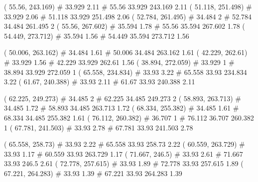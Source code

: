 \documentclass[a4paper,openbib,10pt]{article}
\newenvironment{treegraph}{\begin{graph}}{\end{graph}}
\begin{document}
\begin{treegraph}
  ( 55.56, 243.169) #     33.929    2.11
   #    55.56    33.929    243.169    2.11
  ( 51.118, 251.498) #     33.929    2.06
   #    51.118    33.929    251.498    2.06
  ( 52.784, 261.495) #     34.484    2
   #    52.784    34.484    261.495    2
  ( 55.56, 267.602) #     35.594    1.78
   #    55.56    35.594    267.602    1.78
  ( 54.449, 273.712) #     35.594    1.56
   #    54.449    35.594    273.712    1.56

  ( 50.006, 263.162) #     34.484    1.61
   #    50.006    34.484    263.162    1.61
  ( 42.229, 262.61) #     33.929    1.56
   #    42.229    33.929    262.61    1.56
  ( 38.894, 272.059) #     33.929    1
   #    38.894    33.929    272.059    1
  ( 65.558, 234.834) #     33.93    3.22
   #    65.558    33.93    234.834    3.22
  ( 61.67, 240.388) #     33.93    2.11
   #    61.67    33.93    240.388    2.11

  ( 62.225, 249.273) #     34.485    2
   #    62.225    34.485    249.273    2
  ( 58.893, 263.713) #     34.485    1.72
   #    58.893    34.485    263.713    1.72
  ( 68.334, 255.382) #     34.485    1.61
   #    68.334    34.485    255.382    1.61
  ( 76.112, 260.382) #     36.707    1
   #    76.112    36.707    260.382    1
  ( 67.781, 241.503) #     33.93    2.78
   #    67.781    33.93    241.503    2.78

  ( 65.558, 258.73) #     33.93    2.22
   #    65.558    33.93    258.73    2.22
  ( 60.559, 263.729) #     33.93    1.17
   #    60.559    33.93    263.729    1.17
  ( 71.667, 246.5) #     33.93    2.61
   #    71.667    33.93    246.5    2.61
  ( 72.778, 257.615) #     33.93    1.89
   #    72.778    33.93    257.615    1.89
  ( 67.221, 264.283) #     33.93    1.39
   #    67.221    33.93    264.283    1.39


\end{treegraph}
\end{document}
